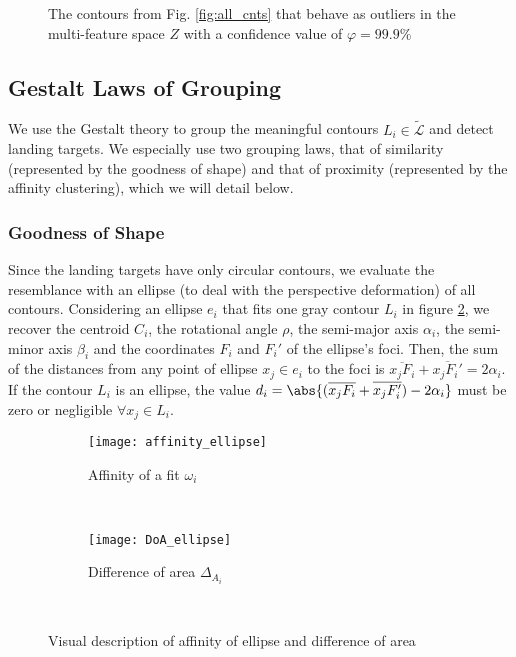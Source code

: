 \begin{figure}[!ht]
    \centering
    \caption{The contours from Fig. \ref{fig:all_cnts} that behave as outliers in the multi-feature space $Z$ with a confidence value of $\varphi=99.9\%$}
    \label{fig:rx_cnts}
\end{figure}

\subsection{Gestalt Laws of Grouping}\label{subsec:Gestalt}
We use the Gestalt theory \citep{Wertheimer:Psycologische:1923} to group the meaningful contours $L_{i}\in \widetilde{\mathcal{L}}$ and detect landing targets. We especially use two grouping laws, that of similarity (represented by the goodness of shape) and that of proximity (represented by the affinity clustering), which we will detail below.

\subsubsection{Goodness of Shape}\label{subsec:similarity}
Since the landing targets have only circular contours, we evaluate the resemblance with an ellipse (to deal with the perspective deformation) of all contours. Considering an ellipse $e_{i}$ that fits one gray contour $L_{i}$ in figure \ref{fig:affinity}, we recover the centroid $C_{i}$, the rotational angle $\rho$, the semi-major axis $\alpha_i$, the semi-minor axis $\beta_{i}$ and the coordinates $F_{i}$ and $F_{i}'$ of the ellipse's foci. Then, the sum of the distances from any point of ellipse $x_{j}\in e_{i}$ to the foci is $\overline{x_{j}F_{i}}+\overline{x_{j}F_{i}'}=2\alpha_{i}$. If the contour $L_{i}$ is an ellipse, the value $d_{i}=\abs{(\overline{x_{j}F_{i}}+\overline{x_{j}F_{i}'})-2\alpha_{i} }$ must be zero or negligible $\forall x_{j}\in L_{i}$. 

\begin{figure}[h]
    \centering
    \begin{subfigure}[b]{0.45\textwidth}
        \texttt{[image: affinity\_ellipse]}
        \caption{Affinity of a fit $\omega_{i}$}
        \label{fig:affinity}
    \end{subfigure}
    ~ %
    \begin{subfigure}[b]{0.5\textwidth}
        \texttt{[image: DoA\_ellipse]}
        \caption{Difference of area $\Delta_{A_{i}}$}
        \label{fig:DoA}
    \end{subfigure}\\
    \caption{Visual description of affinity of ellipse and difference of area}\label{fig:ressemblance_ellipse}
\end{figure}

